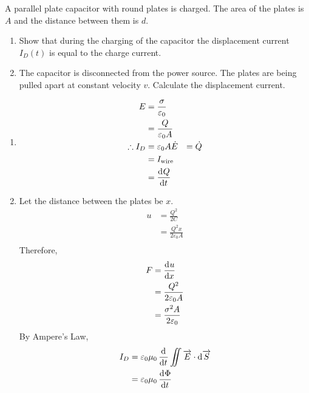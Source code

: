 \documentclass[fleqn, a4paper, 12pt, twoside]{article}
\theoremstyle{definition}
\theoremstyle{theorem}
\begin{document}
\addtocounter{question}{2}

\begin{question}
	A parallel plate capacitor with round plates is charged.
	The area of the plates is $A$ and the distance between them is $d$.
	\begin{enumerate}
		\item Show that during the charging of the capacitor the displacement current $I_D(t)$ is equal to the charge current.
		\item
			The capacitor is disconnected from the power source.
			The plates are being pulled apart at constant velocity $v$.
			Calculate the displacement current.
	\end{enumerate}
\end{question}

\begin{solution}
	\begin{enumerate}[leftmargin = *]
		\item
			\begin{align*}
				E &= \frac{\sigma}{\varepsilon_0}\\
				&= \frac{Q}{\varepsilon_0 A}\\
				\therefore I_D &= \varepsilon_0 A \dot{E} &= \dot{Q}\\
				&= I_{\textnormal{wire}}\\
				&= \dod{Q}{t}
			\end{align*}
		\item
			Let the distance between the plates be $x$.
			\begin{align*}
				u &= \frac{Q^2}{2 C}\\
				&= \frac{Q^2 x}{2 \varepsilon_0 A}\\
			\end{align*}
			Therefore,
			\begin{align*}
				F &= \dod{u}{x}\\
				&= \frac{Q^2}{2 \varepsilon_0 A}\\
				&= \frac{\sigma^2 A}{2 \varepsilon_0}
			\end{align*}
			By Ampere's Law,
			\begin{align*}
				I_D &= \varepsilon_0 \mu_0 \dod{}{t}\iint \overrightarrow{E} \cdot \dif \overrightarrow{S}\\
				&= \varepsilon_0 \mu_0 \dod{\Phi}{t}
			\end{align*}
	\end{enumerate}
\end{solution}
\end{document}
